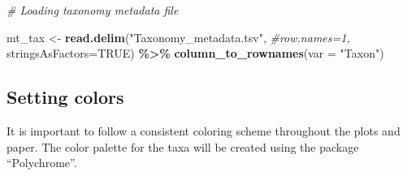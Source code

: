 \documentclass[
]{article}
\newenvironment{Shaded}{\begin{snugshade}}{\end{snugshade}}
\newcommand{\AttributeTok}[1]{\textcolor[rgb]{0.13,0.29,0.53}{#1}}
\newcommand{\CommentTok}[1]{\textcolor[rgb]{0.56,0.35,0.01}{\textit{#1}}}
\newcommand{\ConstantTok}[1]{\textcolor[rgb]{0.56,0.35,0.01}{#1}}
\newcommand{\FunctionTok}[1]{\textcolor[rgb]{0.13,0.29,0.53}{\textbf{#1}}}
\newcommand{\NormalTok}[1]{#1}
\newcommand{\OtherTok}[1]{\textcolor[rgb]{0.56,0.35,0.01}{#1}}
\newcommand{\SpecialCharTok}[1]{\textcolor[rgb]{0.81,0.36,0.00}{\textbf{#1}}}
\newcommand{\StringTok}[1]{\textcolor[rgb]{0.31,0.60,0.02}{#1}}
\begin{document}
\begin{Shaded}
\begin{Highlighting}[]
\CommentTok{\# Loading taxonomy metadata file}

\NormalTok{mt\_tax }\OtherTok{\textless{}{-}} \FunctionTok{read.delim}\NormalTok{(}\StringTok{"Taxonomy\_metadata.tsv"}\NormalTok{, }
                     \CommentTok{\#row.names=1, }
                     \AttributeTok{stringsAsFactors=}\ConstantTok{TRUE}\NormalTok{) }\SpecialCharTok{\%\textgreater{}\%}
          \FunctionTok{column\_to\_rownames}\NormalTok{(}\AttributeTok{var =} \StringTok{"Taxon"}\NormalTok{)}
\end{Highlighting}
\end{Shaded}

\subsection{Setting colors}\label{setting-colors}

It is important to follow a consistent coloring scheme throughout the
plots and paper. The color palette for the taxa will be created using
the package ``Polychrome''.
\end{document}
